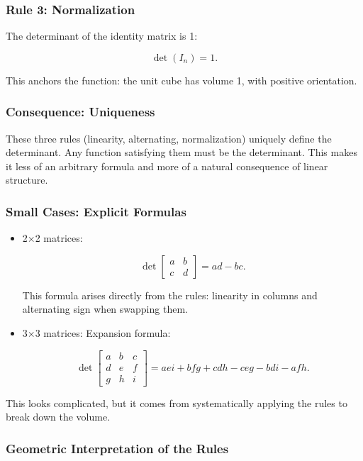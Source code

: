 \documentclass[
  letterpaper,
  DIV=11,
  numbers=noendperiod]{scrreprt}
\begin{document}
\subsubsection{Rule 3: Normalization}\label{rule-3-normalization}

The determinant of the identity matrix is 1:

\[
\det(I_n) = 1.
\]

This anchors the function: the unit cube has volume 1, with positive
orientation.

\subsubsection{Consequence: Uniqueness}\label{consequence-uniqueness}

These three rules (linearity, alternating, normalization) uniquely
define the determinant. Any function satisfying them must be the
determinant. This makes it less of an arbitrary formula and more of a
natural consequence of linear structure.

\subsubsection{Small Cases: Explicit
Formulas}\label{small-cases-explicit-formulas}

\begin{itemize}
\item
  2×2 matrices:

  \[
  \det \begin{bmatrix} a & b \\ c & d \end{bmatrix} = ad - bc.
  \]

  This formula arises directly from the rules: linearity in columns and
  alternating sign when swapping them.
\item
  3×3 matrices: Expansion formula:

  \[
  \det \begin{bmatrix} 
  a & b & c \\ 
  d & e & f \\ 
  g & h & i 
  \end{bmatrix} 
  = aei + bfg + cdh - ceg - bdi - afh.
  \]
\end{itemize}

This looks complicated, but it comes from systematically applying the
rules to break down the volume.

\subsubsection{Geometric Interpretation of the
Rules}\label{geometric-interpretation-of-the-rules}
\end{document}
